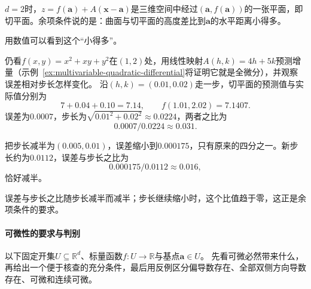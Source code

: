 $d=2$时，$z=f(\bm a)+A(\bm x-\bm a)$是三维空间中经过$(\bm a,f(\bm a))$的一张平面，即切平面。余项条件说的是：曲面与切平面的高度差比到$\bm a$的水平距离小得多。

用数值可以看到这个“小得多”。
\begin{example}[切平面误差随步长缩小]
\label{ex:multivariable-tangent-plane-error}
仍看$f(x,y)=x^2+xy+y^2$在$(1,2)$处，用线性映射$A(h,k)=4h+5k$预测增量（示例~\ref{ex:multivariable-quadratic-differential}将证明它就是全微分），并观察误差相对步长怎样变化。
沿$(h,k)=(0.01,0.02)$走一步，切平面的预测值与实际值分别为
\[
 7+0.04+0.10=7.14,\qquad f(1.01,2.02)=7.1407.
\]
误差为$0.0007$，步长为$\sqrt{0.01^2+0.02^2}\approx0.0224$，两者之比为
\[
 0.0007/0.0224\approx0.031.
\]

把步长减半为$(0.005,0.01)$，误差缩小到$0.000175$，只有原来的四分之一。新步长约为$0.0112$，误差与步长之比为
\[
 0.000175/0.0112\approx0.016,
\]
恰好减半。
\end{example}

误差与步长之比随步长减半而减半；步长继续缩小时，这个比值趋于零，这正是余项条件的要求。

\paragraph{可微性的要求与判别}
\label{sec:analysis-differentiability-relations}

以下固定开集$U\subseteq\mathbb R^d$、标量函数$f:U\to\mathbb R$与基点$\bm a\in U$。
先看可微必然带来什么，再给出一个便于核查的充分条件，最后用反例区分偏导数存在、全部双侧方向导数存在、可微和连续可微。

